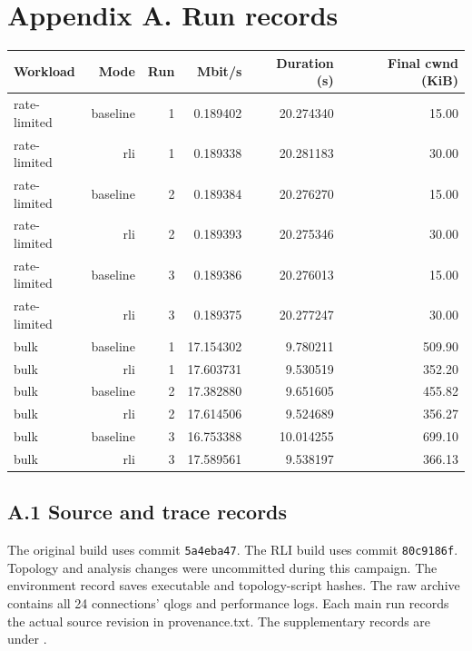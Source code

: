 \clearpage
\section*{Appendix A. Run records}
\label{sec:appendix}
\begin{center}\small\begin{tabular}{lrrrrr}
Workload & Mode & Run & Mbit/s & Duration (s) & Final cwnd (KiB) \\ \hline
rate-limited & baseline & 1 & 0.189402 & 20.274340 & 15.00 \\
rate-limited & rli & 1 & 0.189338 & 20.281183 & 30.00 \\
rate-limited & baseline & 2 & 0.189384 & 20.276270 & 15.00 \\
rate-limited & rli & 2 & 0.189393 & 20.275346 & 30.00 \\
rate-limited & baseline & 3 & 0.189386 & 20.276013 & 15.00 \\
rate-limited & rli & 3 & 0.189375 & 20.277247 & 30.00 \\
bulk & baseline & 1 & 17.154302 & 9.780211 & 509.90 \\
bulk & rli & 1 & 17.603731 & 9.530519 & 352.20 \\
bulk & baseline & 2 & 17.382880 & 9.651605 & 455.82 \\
bulk & rli & 2 & 17.614506 & 9.524689 & 356.27 \\
bulk & baseline & 3 & 16.753388 & 10.014255 & 699.10 \\
bulk & rli & 3 & 17.589561 & 9.538197 & 366.13 \\
\end{tabular}\end{center}
\subsection*{A.1 Source and trace records}
The original build uses commit \texttt{5a4eba47}.
The RLI build uses commit \texttt{80c9186f}.
Topology and analysis changes were uncommitted during this campaign.
The environment record saves executable and topology-script hashes.
The raw archive contains all 24 connections' qlogs and performance logs.
Each main run records the actual source revision in provenance.txt.
The supplementary records are under  \cite{ref13}.
\label{sec:appendix-end}
